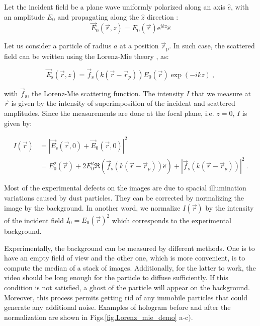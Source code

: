 Let the incident field be a plane wave uniformly polarized along an axis $ \hat{e}$, with an amplitude $E_0$ and propagating along the $\hat{z}$ direction :
\begin{equation}
	\vec{E}_0(\vec{r},z) = E_0(\vec{r}) \mathrm{e}^{ikz}\hat{e}
\end{equation}

Let us consider a particle of radius $a$ at a position $\vec{r}_\mathrm{p} $. In such case, the scattered field can be written using the Lorenz-Mie theory \cite{f_bohren_absorption_1998}, as:

\begin{equation}
	\vec{E}_\mathrm{s}(\vec{r}, z) =  \vec{f}_\mathrm{s}(k(\vec{r} - \vec{r}_p))E_0(\vec{r}) \exp \left(-ikz\right) ~,
	\label{EMie}
\end{equation} 

with $\vec{f}_\mathrm{s}$, the Lorenz-Mie scattering function. The intensity $I$ that we measure at $\vec{r}$ is given by the intensity of superimposition of the incident and scattered amplitudes. Since the measurements are done at the focal plane, i.e. $z = 0 $, $I$ is given by:

\begin{equation}
	\begin{aligned}
		I(\vec{r}) & = |\vec{E}_\mathrm{s}(\vec{r}, 0) + \vec{E}_0(\vec{r}, 0)|^2 \\
		& = E_0^2(\vec{r}) + 2 E_0^2\Re \left(\vec{f}_\mathrm{s}(k(\vec{r}- \vec{r}_p)) \hat{e}\right) + | \vec{f}_\mathrm{s}(k(\vec{r}- \vec{r}_p)) |^2 ~.
	\end{aligned}
\end{equation}

Most of the experimental defects on the images are due to spacial illumination variations caused by dust particles. They can be corrected by normalizing the image by the background. In another word, we normalize $I(\vec{r})$ by the intensity of the incident field $I_0 = E_0(\vec{r})^2$ which corresponds to the experimental background. 

Experimentally, the background can be measured by different methods. One is to have an empty field of view and the other one, which is more convenient, is to compute the median of a stack of images. Additionally, for the latter to work, the video should be long enough for the particle to diffuse sufficiently. If this condition is not satisfied, a ghost of the particle will appear on the background. Moreover, this process permits getting rid of any immobile particles that could generate any additional noise. Examples of hologram before and after the normalization are shown in Figs.\ref{fig.Lorenz_mie_demo} a-c).

